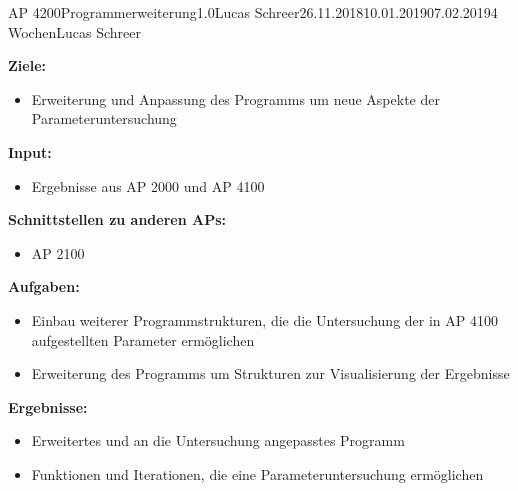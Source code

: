 \clearpage
\begin{wpd}{AP 4200}{Programmerweiterung}{1.0}{Lucas Schreer}{26.11.2018}{10.01.2019}{07.02.2019}{4 Wochen}{Lucas Schreer}
    {
    \textbf{Ziele:}
    \begin{itemize}
        \item Erweiterung und Anpassung des Programms um neue Aspekte der Parameteruntersuchung
    \end{itemize}
    \textbf{Input:}
    \begin{itemize}
        \item Ergebnisse aus AP 2000 und AP 4100
    \end{itemize}
    \textbf{Schnittstellen zu anderen APs:}
    \begin{itemize}
        \item AP 2100
    \end{itemize}
    \textbf{Aufgaben:}
    \begin{itemize}
        \item Einbau weiterer Programmstrukturen, die die Untersuchung der in AP 4100 aufgestellten Parameter ermöglichen
        \item Erweiterung des Programms um Strukturen zur Visualisierung der Ergebnisse
    \end{itemize}
    \textbf{Ergebnisse:}
    \begin{itemize}
        \item Erweitertes und an die Untersuchung angepasstes Programm 
        \item Funktionen und Iterationen, die eine Parameteruntersuchung ermöglichen  
    \end{itemize}
    }
\end{wpd}


